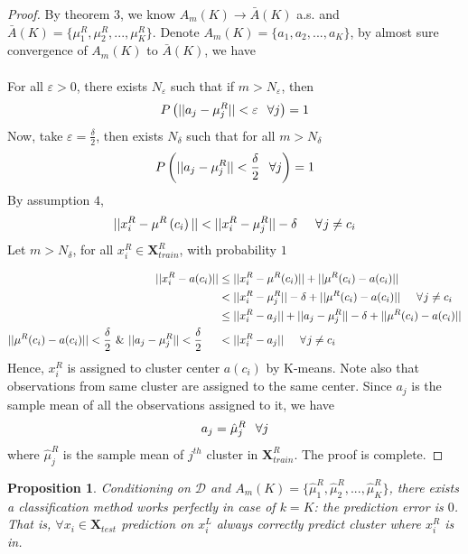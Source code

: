 \documentclass[11pt]{article}
\newtheorem{proposition}{Proposition}
\begin{document}
\begin{proof}
By theorem $3$, we know $A_m(K) \to \bar{A}(K)$ a.s. and $\bar{A}(K) = \{\mu^R_1,\mu^R_2,...,\mu^R_K\}$. Denote $A_m(K) = \{a_1, a_2,..., a_K\}$, by almost sure convergence of $A_m(K)$ to $\bar{A}(K)$, we have\\\\
For all $\varepsilon > 0$, there exists $N_{\varepsilon}$ such that if $m > N_{\varepsilon}$, then
\[ P\left(||a_j-\mu^R_j||< \varepsilon\hspace{0.1in}\forall j\right)=1\]
 Now, take $\varepsilon = \frac{\delta}{2}$, then exists $N_{\delta}$ such that for all $m > N_{\delta}$
\[P\left(||a_j-\mu^R_j||<\frac{\delta}{2} \hspace{0.1in}\forall j\right)=1\]
By assumption $4$, 
\[||x^R_i-\mu^R \left(c_i\right)|| < ||x^R_i-\mu^R_{j}||-\delta \hspace{0.2 in}\forall \hspace{0.01 in}j\neq c_i\]
Let $m > N_{\delta}$, for all $x^R_i \in \mathbf{X}^R_{train}$, with probability $1$

\begin{align}
  ||x^R_i - a(c_i)||&\leq ||x^R_i-\mu^R(c_i)|| + ||\mu^R(c_i)-a(c_i)||\nonumber \\ \nonumber
   &< ||x^R_i-\mu^R_{j}||-\delta + ||\mu^R(c_i)-a(c_i)|| \hspace{0.2 in} \forall \hspace{0.01 in}j\neq c_i  \\ \nonumber
    &\leq ||x^R_i-a_{j}|| + ||a_j - \mu^R_{j}||-\delta + ||\mu^R(c_i)-a(c_i)||  \\ \nonumber
 ||\mu^R(c_i)-a(c_i)||< \frac{\delta}{2} \hspace{0.05in}\& \hspace{0.05in}||a_j - \mu^R_{j}||< \frac{\delta}{2} \hspace{0.2in} &<||x^R_i-a_{j}||\hspace{0.2 in}  \forall \hspace{0.01 in}j\neq c_i 
\end{align}
Hence, $x^R_i$ is assigned to cluster center $a(c_i)$ by K-means. Note also that observations from same cluster are assigned to the same center. Since $a_j$ is the sample mean of all the observations assigned to it, we have
\[a_j = \hat{\mu}^R_j \hspace{0.1in}\forall j\]
 where $\hat{\mu}^R_j$ is the sample mean of $j^{th}$ cluster in $\mathbf{X}^R_{train}$. The proof is complete.
\end{proof}
\begin{proposition}
Conditioning on $\mathcal{D}$ and $A_m(K) = \{\hat{\mu}^R_1,\hat{\mu}^R_2,...,\hat{\mu}^R_K \}$, there exists a classification method works perfectly in case of $k = K$: the prediction error is $0$. That is, $\forall x_i \in \mathbf{X}_{test}$ prediction on $x^L_i$ always correctly predict cluster where $x^R_i$ is in. 
\end{proposition}
\end{document}
